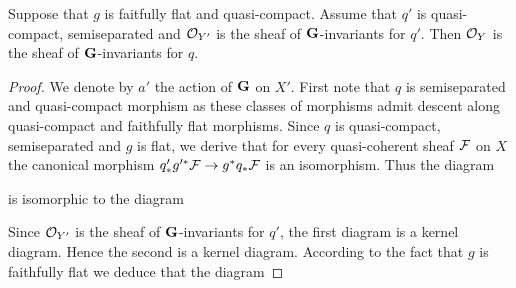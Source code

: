 \begin{proposition}\label{proposition:faithfully_flat_descent_for_invariants}
Suppose that $g$ is faitfully flat and quasi-compact. Assume that $q'$ is quasi-compact, semiseparated and ${\mathcal O}_{Y'}$ is the sheaf of $\mathbf{G}$-invariants for $q'$. Then ${\mathcal O}_Y$ is the sheaf of $\mathbf{G}$-invariants for $q$.
\end{proposition}
\begin{proof}
We denote by $a'$ the action of $\mathbf{G}$ on $X'$. First note that $q$ is semiseparated and quasi-compact morphism as these classes of morphisms admit descent along quasi-compact and faithfully flat morphisms. Since $q$ is quasi-compact, semiseparated and $g$ is flat, we derive that for every quasi-coherent sheaf ${\mathcal F}$ on $X$ the canonical morphism $q'_*g'^*{\mathcal F} \rightarrow  g^*q_*{\mathcal F}$ is an isomorphism. Thus the diagram
\begin{center}
\end{center}
is isomorphic to the diagram
\begin{center}
\end{center}
Since ${\mathcal O}_{Y'}$ is the sheaf of $\mathbf{G}$-invariants for $q'$, the first diagram is a kernel diagram. Hence the second is a kernel diagram. According to the fact that $g$ is faithfully flat we deduce that the diagram

\end{proof}
